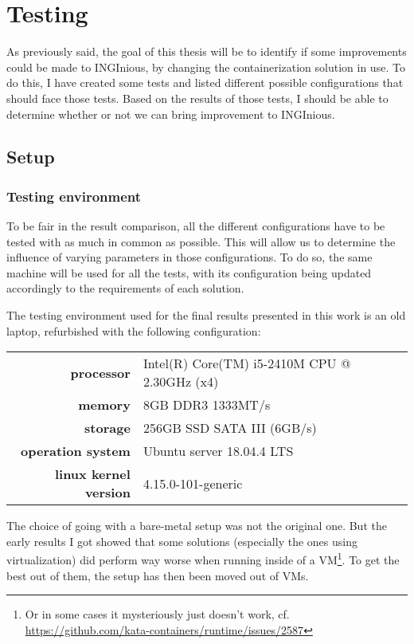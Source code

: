 \chapter{Testing}

As previously said, the goal of this thesis will be to identify if some improvements could be made to INGInious, by changing the containerization solution in use.  To do this, I have created some tests and listed different possible configurations that should face those tests.  Based on the results of those tests, I should be able to determine whether or not we can bring improvement to INGInious.

\section{Setup}
\subsection{Testing environment}
To be fair in the result comparison, all the different configurations have to be tested with as much in common as possible.  This will allow us to determine the influence of varying parameters in those configurations.  To do so, the same machine will be used for all the tests, with its configuration being updated accordingly to the requirements of each solution.

The testing environment used for the final results presented in this work is an old laptop, refurbished with the following configuration:\\
\begin{tabular}{rl}

  \textbf{processor} & Intel(R) Core(TM) i5-2410M CPU @ 2.30GHz (x4) \\
  \textbf{memory} & 8GB DDR3 1333MT/s \\
  \textbf{storage} & 256GB SSD SATA III (6GB/s)\\
  \textbf{operation system} & Ubuntu server 18.04.4 LTS \\
  \textbf{linux kernel version} & 4.15.0-101-generic \\

\end{tabular}


The choice of going with a bare-metal setup was not the original one.  But the early results I got showed that some solutions (especially the ones using virtualization) did perform way worse when running inside of a VM\footnote{Or in some cases it mysteriously just doesn't work, cf. \href{https://github.com/kata-containers/runtime/issues/2587}{https://github.com/kata-containers/runtime/issues/2587}}.  To get the best out of them, the setup has then been moved out of VMs.

